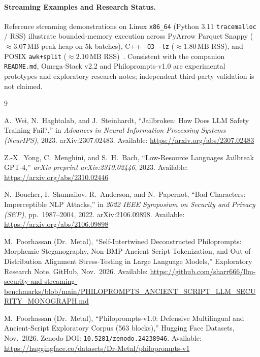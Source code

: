 \documentclass[11pt,a4paper]{article}
\begin{document}
\paragraph{Streaming Examples and Research Status.}
Reference streaming demonstrations on Linux \texttt{x86\_64} (Python 3.11 \texttt{tracemalloc} / RSS) illustrate bounded-memory execution across PyArrow Parquet Snappy ($\approx 3.07\,\mathrm{MB}$ peak heap on 5k batches), C++ \texttt{-O3 -lz} ($\approx 1.80\,\mathrm{MB}$ RSS), and POSIX \texttt{awk+split} ($\approx 2.10\,\mathrm{MB}$ RSS)~\cite{poorhassan2026repo}. Consistent with the companion \texttt{README.md}, Omega-Stack v2.2 and Philoprompts-v1.0 are experimental prototypes and exploratory research notes; independent third-party validation is not claimed.

\begin{thebibliography}{9}

A.~Wei, N.~Haghtalab, and J.~Steinhardt,
``Jailbroken: How Does LLM Safety Training Fail?,''
in \emph{Advances in Neural Information Processing Systems (NeurIPS)}, 2023.
arXiv:2307.02483. Available: \url{https://arxiv.org/abs/2307.02483}

Z.-X.~Yong, C.~Menghini, and S.~H.~Bach,
``Low-Resource Languages Jailbreak GPT-4,''
\emph{arXiv preprint arXiv:2310.02446}, 2023.
Available: \url{https://arxiv.org/abs/2310.02446}

N.~Boucher, I.~Shumailov, R.~Anderson, and N.~Papernot,
``Bad Characters: Imperceptible NLP Attacks,''
in \emph{2022 IEEE Symposium on Security and Privacy (S\&P)}, pp.~1987--2004, 2022.
arXiv:2106.09898. Available: \url{https://arxiv.org/abs/2106.09898}

M.~Poorhassan (Dr.\ Metal),
``Self-Intertwined Deconstructed Philoprompts: Morphemic Steganography, Non-BMP Ancient Script Tokenization, and Out-of-Distribution Alignment Stress-Testing in Large Language Models,''
Exploratory Research Note, GitHub, Nov.\ 2026.
Available: \url{https://github.com/sharr666/llm-security-and-streaming-benchmarks/blob/main/PHILOPROMPTS_ANCIENT_SCRIPT_LLM_SECURITY_MONOGRAPH.md}

M.~Poorhassan (Dr.\ Metal),
``Philoprompts-v1.0: Defensive Multilingual and Ancient-Script Exploratory Corpus (563 blocks),''
Hugging Face Datasets, Nov.\ 2026.
Zenodo DOI: \texttt{10.5281/zenodo.24238946}.
Available: \url{https://huggingface.co/datasets/Dr-Metal/philoprompts-v1}


\end{thebibliography}
\end{document}
